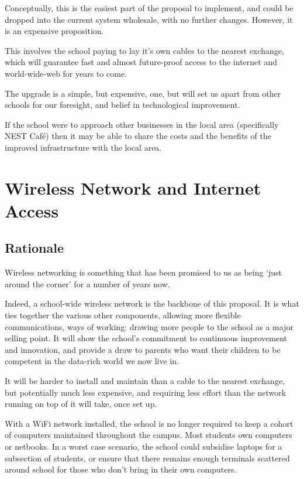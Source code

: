 \documentclass[a4paper,leqno,titlepage]{article}
\begin{document}
Conceptually, this is the easiest part of the proposal to implement,
and could be dropped into the current system wholesale, with no further changes.
However, it is an expensive proposition.


This involves the school paying to lay it's own cables to the nearest exchange,
which will guarantee fast and almost future-proof access to the internet and
world-wide-web for years to come.


The upgrade is a simple, but expensive, one, but will set us apart from other
schools for our foresight, and belief in technological improvement.


If the school were to approach other businesses in the local area (specifically
NEST Café) then it may be able to share the costs and the benefits of the
improved infrastructure with the local area.






\section{Wireless Network and Internet Access}\label{Wireless Network and Internet Access}


\subsection{Rationale}

Wireless networking is something that has been promised to us as being `just
around the corner' for a number of years now.


Indeed, a school-wide wireless network is the backbone of this proposal. It is
what ties together the various other components, allowing more flexible
communications, ways of working: drawing more people to the school as a
major selling point. It will show the school's commitment to continuous
improvement and innovation, and provide a draw to parents who want their
children to be competent in the data-rich world we now live in.


It will be harder to install and maintain than a cable to the nearest exchange,
but potentially much less expensive, and requiring less effort than the network
running on top of it will take, once set up.


With a WiFi network installed, the school is no longer required to keep a cohort
of computers maintained throughout the campus. Most students own computers
or netbooks. In a worst case scenario, the school could subsidise laptops for a
subsection of students, or ensure that there remains enough terminals scattered
around school for those who don't bring in their own computers.
\end{document}
